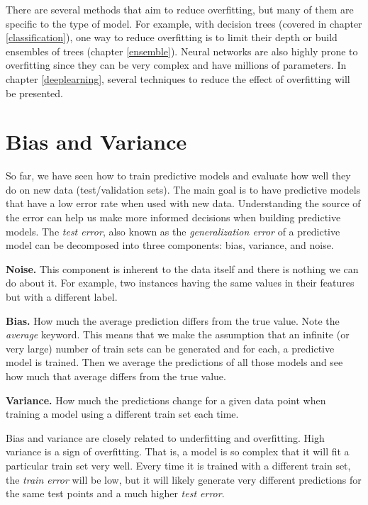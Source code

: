 \documentclass[
  11pt,
]{krantz}
\begin{document}
There are several methods that aim to reduce overfitting, but many of them are specific to the type of model. For example, with decision trees (covered in chapter \ref{classification}), one way to reduce overfitting is to limit their depth or build ensembles of trees (chapter \ref{ensemble}). Neural networks are also highly prone to overfitting since they can be very complex and have millions of parameters. In chapter \ref{deeplearning}, several techniques to reduce the effect of overfitting will be presented.

\hypertarget{bias-and-variance}{%
\section{Bias and Variance}\label{bias-and-variance}}

So far, we have seen how to train predictive models and evaluate how well they do on new data (test/validation sets). The main goal is to have predictive models that have a low error rate when used with new data. Understanding the source of the error can help us make more informed decisions when building predictive models. The \emph{test error}, also known as the \emph{generalization error} of a predictive model can be decomposed into three components: bias, variance, and noise.

\textbf{Noise.} This component is inherent to the data itself and there is nothing we can do about it. For example, two instances having the same values in their features but with a different label.

\textbf{Bias.} How much the average prediction differs from the true value. Note the \emph{average} keyword. This means that we make the assumption that an infinite (or very large) number of train sets can be generated and for each, a predictive model is trained. Then we average the predictions of all those models and see how much that average differs from the true value.

\textbf{Variance.} How much the predictions change for a given data point when training a model using a different train set each time.

Bias and variance are closely related to underfitting and overfitting. High variance is a sign of overfitting. That is, a model is so complex that it will fit a particular train set very well. Every time it is trained with a different train set, the \emph{train error} will be low, but it will likely generate very different predictions for the same test points and a much higher \emph{test error}.
\end{document}
